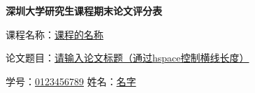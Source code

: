 \begin{titlepage}
    { %
        \centering %
        {\bfseries\Large 深圳大学研究生课程期末论文评分表 \\[0.8cm]}
        \raggedright                %


        \noindent
        课程名称：\underline{\hspace{4cm}课程的名称\hspace{4.4cm}}

        \noindent
        论文题目：\underline{\hspace{1cm}请输入论文标题（通过hspace控制横线长度）\hspace{1cm}}

        \noindent
        学\hspace{2em}号：\underline{\hspace{1cm}0123456789\hspace{1cm}} \hspace{1em} 姓\hspace{2em}名：\underline{\hspace{3em}名字\hspace{3em}}

        \vspace{0.5cm} %

}
\end{titlepage}
